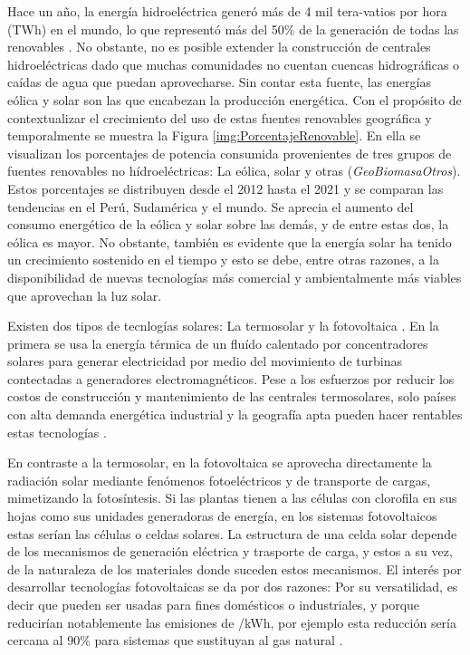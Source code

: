 Hace un año, la energía hidroeléctrica generó más de 4 mil tera-vatios por hora (TWh) en el mundo, lo que representó más del 50\% de la generación de todas las renovables \cite{irena2022international}. No obstante, no es posible extender la construcción de centrales hidroeléctricas dado que muchas comunidades no cuentan cuencas hidrográficas o caídas de agua que puedan aprovecharse. Sin contar esta fuente, las energías eólica y solar son las que encabezan la producción energética. Con el propósito de contextualizar el crecimiento del uso de estas fuentes renovables geográfica y temporalmente se muestra la Figura \ref{img:PorcentajeRenovable}. En ella se visualizan los porcentajes de potencia consumida provenientes de tres grupos de fuentes renovables no hídroeléctricas: La eólica, solar y otras (\textit{GeoBiomasaOtros}). Estos porcentajes se distribuyen desde el 2012 hasta el 2021 y se comparan las tendencias en el Perú, Sudamérica y el mundo. Se aprecia el aumento del consumo energético de la eólica y solar sobre las demás, y de entre estas dos, la eólica es mayor. No obstante, también es evidente que la energía solar ha tenido un crecimiento sostenido en el tiempo y esto se debe, entre otras razones, a la disponibilidad de nuevas tecnologías más comercial y ambientalmente más viables que aprovechan la luz solar.



Existen dos tipos de tecnlogías solares: La termosolar y la fotovoltaica \cite{hammarstrom2012}. En la primera se usa la energía térmica de un fluído calentado por concentradores solares para generar electricidad por medio del movimiento de turbinas contectadas a generadores electromagnéticos. Pese a los esfuerzos por reducir los costos de construcción y mantenimiento de las centrales termosolares, solo países con alta demanda energética industrial y la geografía apta pueden hacer rentables estas tecnologías \cite{xu2022concentrated}.


En contraste a la termosolar, en la fotovoltaica se aprovecha directamente la radiación solar mediante fenómenos fotoeléctricos y de transporte de cargas, mimetizando la fotosíntesis. Si las plantas tienen a las células con clorofila en sus hojas como sus unidades generadoras de energía, en los sistemas fotovoltaicos estas serían las células o celdas solares. La estructura de una celda solar depende de los mecanismos de generación eléctrica y trasporte de carga, y estos a su vez, de la naturaleza de los materiales donde suceden estos mecanismos. El interés por desarrollar tecnologías fotovoltaicas se da por dos razones: Por su versatilidad, es decir que pueden ser usadas para fines domésticos o industriales, y  porque reducirían notablemente las emisiones de /kWh, por ejemplo esta reducción sería cercana al 90\% para sistemas que sustituyan al gas natural \cite{tawalbeh2021environmental}.


